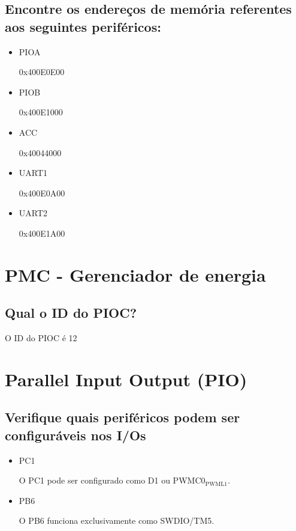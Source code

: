 \documentclass[11pt]{article}
\begin{document}
\subsection{Encontre os endereços de memória referentes aos seguintes periféricos:}
\label{sec:orgheadline3}
\begin{itemize}
\item PIOA

0x400E0E00

\item PIOB

0x400E1000

\item ACC

0x40044000

\item UART1

0x400E0A00

\item UART2

0x400E1A00
\end{itemize}

\section{PMC - Gerenciador de energia}
\label{sec:orgheadline6}
\subsection{Qual o ID do PIOC?}
\label{sec:orgheadline5}
O ID do PIOC é 12

\section{Parallel Input Output (PIO)}
\label{sec:orgheadline11}
\subsection{Verifique quais periféricos podem ser configuráveis nos I/Os}
\label{sec:orgheadline7}
\begin{itemize}
\item PC1

O PC1 pode ser configurado como D1 ou PWMC0\(_{\text{PWML1}}\).

\item PB6

O PB6 funciona exclusivamente como SWDIO/TM5.
\end{itemize}
\end{document}
